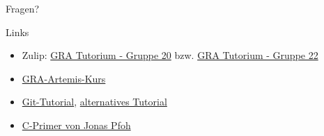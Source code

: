 \documentclass[
  german,            %
  aspectratio=169,    %
]{tumbeamer}
\begin{document}
\begin{frame}[c]{}{}
  \begin{center}
    \LARGE Fragen?
  \end{center}
\end{frame}

\begin{frame}[fragile, c]{Links}{}
  \begin{itemize}
    \item Zulip: \href{https://zulip.in.tum.de/#narrow/stream/2267-GRA-Tutorium---Gruppe-20}{\glqq GRA Tutorium - Gruppe 20\grqq}
    bzw. \href{https://zulip.in.tum.de/#narrow/stream/2269-GRA-Tutorium---Gruppe-22}{\glqq GRA Tutorium - Gruppe 22\grqq}
    \item \href{https://artemis.in.tum.de/courses/329}{GRA-Artemis-Kurs}
    \item \href{https://git-scm.com/docs/gittutorial}{Git-Tutorial}, \href{https://rogerdudler.github.io/git-guide/}{alternatives Tutorial}
    \item \href{https://www.sec.in.tum.de/i20/assets/vorlesung/c_primer.pdf}{C-Primer von Jonas Pfoh}
  \end{itemize}
\end{frame}

\maketitle
\end{document}
